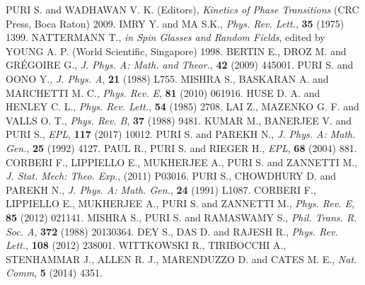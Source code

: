 \documentclass[pre,twocolumn,amssymb,showpacs,superscriptaddress,notitlepage]{revtex4-1}
\begin{document}
\begin{thebibliography}{10}
%
 PURI S. and WADHAWAN V. K. (Editors), {\it Kinetics of Phase Transitions} (CRC Press, Boca Raton) 2009.
%
 IMRY Y. and MA S.K., {\it Phys. Rev. Lett.}, \textbf{35} (1975) 1399.
% 
 NATTERMANN T., {\it in Spin Glasses and Random Fields}, edited by YOUNG A. P. (World Scientific, Singapore) 1998.
%
 BERTIN E., DROZ M. and GR\'EGOIRE G., {\it J. Phys. A: Math. and Theor.}, {\bf 42} (2009) 445001.
%
 PURI S. and OONO Y., {\it J. Phys. A}, {\bf 21} (1988) L755.
%
 MISHRA S., BASKARAN A. and MARCHETTI M. C., {\it Phys. Rev. E}, {\bf 81} (2010) 061916.
%
 HUSE D. A. and HENLEY C. L., {\it Phys. Rev. Lett.}, {\bf 54} (1985) 2708.
%
 LAI Z., MAZENKO G. F. and VALLS O. T., {\it Phys. Rev. B}, {\bf 37} (1988) 9481.
%
 KUMAR M., BANERJEE V. and PURI S., {\it EPL}, {\bf 117} (2017) 10012.
%
 PURI S. and PAREKH N., {\it J. Phys. A: Math. Gen.}, {\bf 25} (1992) 4127.
%
 PAUL R., PURI S. and RIEGER H., {\it EPL}, {\bf 68} (2004) 881.
%
 CORBERI F., LIPPIELLO E., MUKHERJEE A., PURI S. and ZANNETTI M., {\it J. Stat. Mech: Theo. Exp.}, (2011) P03016.
%
 PURI S., CHOWDHURY D. and PAREKH N., {\it J. Phys. A: Math. Gen.}, {\bf 24} (1991) L1087.
%
 CORBERI F., LIPPIELLO E., MUKHERJEE A., PURI S. and ZANNETTI M., {\it Phys. Rev. E}, {\bf 85} (2012) 021141.
%
 MISHRA S., PURI S. and RAMASWAMY S., {\it Phil. Trans. R. Soc. A}, {\bf 372} (1988) 20130364.
%
 DEY S., DAS D. and RAJESH R., {\it Phys. Rev. Lett.}, {\bf 108} (2012) 238001.
%
 WITTKOWSKI R., TIRIBOCCHI A., STENHAMMAR J., ALLEN R. J., MARENDUZZO D. and CATES M. E., 
{\it Nat. Comm}, {\bf 5} (2014) 4351.
%
\end{thebibliography}

\end{document}
